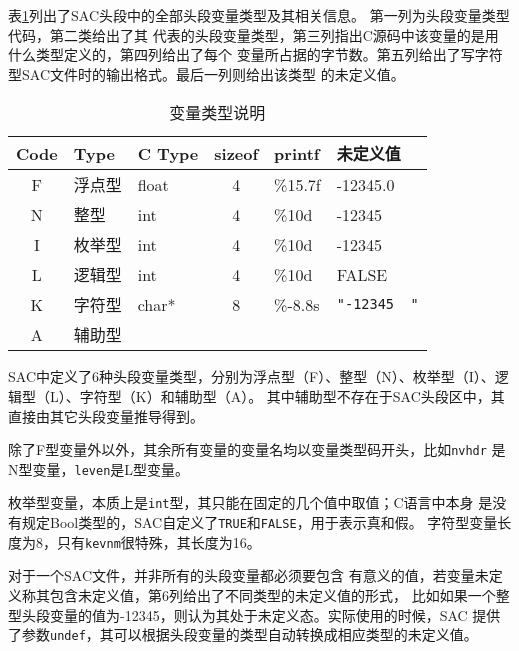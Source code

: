 表\ref{table:header-variables-type}列出了SAC头段中的全部头段变量类型及其相关信息。
第一列为头段变量类型代码，第二类给出了其
代表的头段变量类型，第三列指出C源码中该变量的是用什么类型定义的，第四列给出了每个
变量所占据的字节数。第五列给出了写字符型SAC文件时的输出格式。最后一列则给出该类型
的未定义值。

\begin{table}[H]
\caption{变量类型说明}
\label{table:header-variables-type}
\centering
\ttfamily
\small
\begin{tabular}{cllcll}
	\toprule
    Code    &	Type        &   C Type & sizeof &   printf	&   未定义值        \\
	\midrule
    F		&	浮点型		&   float  &  4     &	\%15.7f &   -12345.0        \\
    N		&	整型		&   int    &  4     &	\%10d   &   -12345        \\
    I		&	枚举型		&   int    &  4     &	\%10d   &   -12345	        \\
    L		&	逻辑型		&   int    &  4     &	\%10d   &   FALSE        \\
    K		&	字符型		&   char*  &  8     &	\%-8.8s & \lstinline[showspaces=true]{"-12345  "}     \\
    A		&	辅助型		&          &        &			& 	    \\
	\bottomrule
\end{tabular}
\end{table}

SAC中定义了6种头段变量类型，分别为浮点型（F）、整型（N）、枚举型（I）、逻辑型（L）、字符型（K）和辅助型（A）。
其中辅助型不存在于SAC头段区中，其直接由其它头段变量推导得到。

除了F型变量外以外，其余所有变量的变量名均以变量类型码开头，比如\lstinline{nvhdr}
是N型变量，\lstinline{leven}是L型变量。

枚举型变量，本质上是\lstinline{int}型，其只能在固定的几个值中取值；C语言中本身
是没有规定Bool类型的，SAC自定义了\lstinline{TRUE}和\lstinline{FALSE}，用于表示真和假。
字符型变量长度为8，只有\lstinline{kevnm}很特殊，其长度为16。

对于一个SAC文件，并非所有的头段变量都必须要包含
有意义的值，若变量未定义称其包含未定义值，第6列给出了不同类型的未定义值的形式，
比如如果一个整型头段变量的值为-12345，则认为其处于未定义态。实际使用的时候，SAC
提供了参数\lstinline{undef}，其可以根据头段变量的类型自动转换成相应类型的未定义值。
